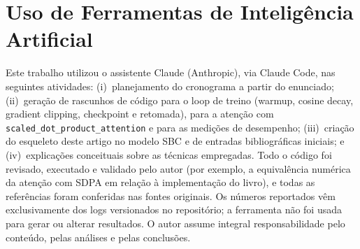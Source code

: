 \documentclass[12pt]{article}
\begin{document}
\section*{Uso de Ferramentas de Inteligência Artificial}
Este trabalho utilizou o assistente Claude (Anthropic), via Claude Code, nas
seguintes atividades: (i)~planejamento do cronograma a partir do enunciado;
(ii)~geração de rascunhos de código para o loop de treino (warmup, cosine decay,
gradient clipping, checkpoint e retomada), para a atenção com
\texttt{scaled\_dot\_product\_attention} e para as medições de desempenho;
(iii)~criação do esqueleto deste artigo no modelo SBC e de entradas
bibliográficas iniciais; e (iv)~explicações conceituais sobre as técnicas
empregadas. Todo o código foi revisado, executado e validado pelo autor (por
exemplo, a equivalência numérica da atenção com SDPA em relação à implementação
do livro), e todas as referências foram conferidas nas fontes originais. Os
números reportados vêm exclusivamente dos logs versionados no repositório; a
ferramenta não foi usada para gerar ou alterar resultados. O autor assume
integral responsabilidade pelo conteúdo, pelas análises e pelas conclusões.



\end{document}
